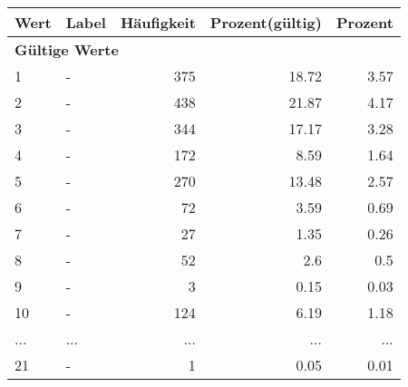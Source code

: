      \begin{longtable}{lXrrr}
     \toprule
     \textbf{Wert} & \textbf{Label} & \textbf{Häufigkeit} & \textbf{Prozent(gültig)} & \textbf{Prozent} \\
     \endhead
     \midrule
     \multicolumn{5}{l}{\textbf{Gültige Werte}}\\
        1 & \multicolumn{1}{X}{-} & %
          \num{375} &
          \num[round-mode=places,round-precision=2]{18.72} &
          \num[round-mode=places,round-precision=2]{3.57} \\
        2 & \multicolumn{1}{X}{-} & %
          \num{438} &
          \num[round-mode=places,round-precision=2]{21.87} &
          \num[round-mode=places,round-precision=2]{4.17} \\
        3 & \multicolumn{1}{X}{-} & %
          \num{344} &
          \num[round-mode=places,round-precision=2]{17.17} &
          \num[round-mode=places,round-precision=2]{3.28} \\
        4 & \multicolumn{1}{X}{-} & %
          \num{172} &
          \num[round-mode=places,round-precision=2]{8.59} &
          \num[round-mode=places,round-precision=2]{1.64} \\
        5 & \multicolumn{1}{X}{-} & %
          \num{270} &
          \num[round-mode=places,round-precision=2]{13.48} &
          \num[round-mode=places,round-precision=2]{2.57} \\
        6 & \multicolumn{1}{X}{-} & %
          \num{72} &
          \num[round-mode=places,round-precision=2]{3.59} &
          \num[round-mode=places,round-precision=2]{0.69} \\
        7 & \multicolumn{1}{X}{-} & %
          \num{27} &
          \num[round-mode=places,round-precision=2]{1.35} &
          \num[round-mode=places,round-precision=2]{0.26} \\
        8 & \multicolumn{1}{X}{-} & %
          \num{52} &
          \num[round-mode=places,round-precision=2]{2.6} &
          \num[round-mode=places,round-precision=2]{0.5} \\
        9 & \multicolumn{1}{X}{-} & %
          \num{3} &
          \num[round-mode=places,round-precision=2]{0.15} &
          \num[round-mode=places,round-precision=2]{0.03} \\
        10 & \multicolumn{1}{X}{-} & %
          \num{124} &
          \num[round-mode=places,round-precision=2]{6.19} &
          \num[round-mode=places,round-precision=2]{1.18} \\
       ... & ... & ... & ... & ... \\
        21 & \multicolumn{1}{X}{-} & %
          \num{1} &
          \num[round-mode=places,round-precision=2]{0.05} &
          \num[round-mode=places,round-precision=2]{0.01} \\


\end{longtable}
